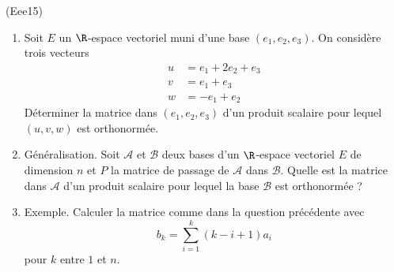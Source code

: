 \begin{tiny}(Eee15)\end{tiny}
\begin{enumerate}
 \item  Soit $E$ un $\R$-espace vectoriel muni d'une base $(e_1,e_2,e_3)$. On considère trois vecteurs
\begin{align*}
 u &= e_1 + 2e_2 + e_3\\
 v &= e_1 + e_3\\
 w &= -e_1 + e_2
\end{align*}
Déterminer la matrice dans $(e_1,e_2,e_3)$ d'un produit scalaire pour lequel $(u,v,w)$ est orthonormée.
\item Généralisation. Soit $\mathcal{A}$ et $\mathcal{B}$ deux bases d'un $\R$-espace vectoriel $E$ de dimension $n$ et $P$ la matrice de passage de $\mathcal{A}$ dans $\mathcal{B}$.\newline
Quelle est la matrice dans $\mathcal{A}$ d'un produit scalaire pour lequel la base $\mathcal{B}$ est orthonormée ?
\item Exemple. Calculer la matrice comme dans la question précédente avec 
\begin{displaymath}
 b_k = \sum_{i=1}^k (k-i+1)a_i
\end{displaymath}
pour $k$ entre $1$ et $n$.
\end{enumerate}
